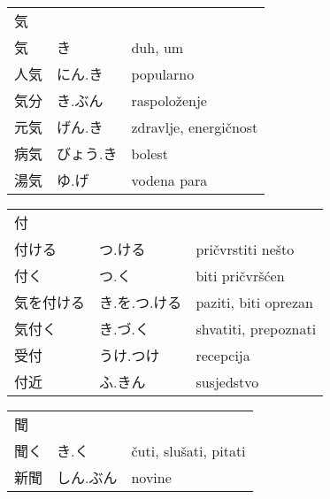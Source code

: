 

\newenvironment{dictentry}[1]{
	\begin{tabular}{p{2cm} p{3cm} p{10cm}}
		#1 &&\\
}{
	\end{tabular}
	\vspace{20pt}
}

\newcommand{\example}[3]{
	\hspace*{\fill}#1 & #2 & #3\\
}

\author{ロボット君}


\begin{dictentry}{気}
\example{気}{き}{duh, um}
\example{人気}{にん.き}{popularno}
\example{気分}{き.ぶん}{raspoloženje}
\example{元気}{げん.き}{zdravlje, energičnost}
\example{病気}{びょう.き}{bolest}
\example{湯気}{ゆ.げ}{vodena para}
\end{dictentry}

\begin{dictentry}{付}
\example{付ける}{つ.ける}{pričvrstiti nešto}
\example{付く}{つ.く}{biti pričvršćen}
\example{気を付ける}{き.を.つ.ける}{paziti, biti oprezan}
\example{気付く}{き.づ.く}{shvatiti, prepoznati}
\example{受付}{うけ.つけ}{recepcija}
\example{付近}{ふ.きん}{susjedstvo}
\end{dictentry}

\begin{dictentry}{聞}
\example{聞く}{き.く}{čuti, slušati, pitati}
\example{新聞}{しん.ぶん}{novine}
\end{dictentry}


